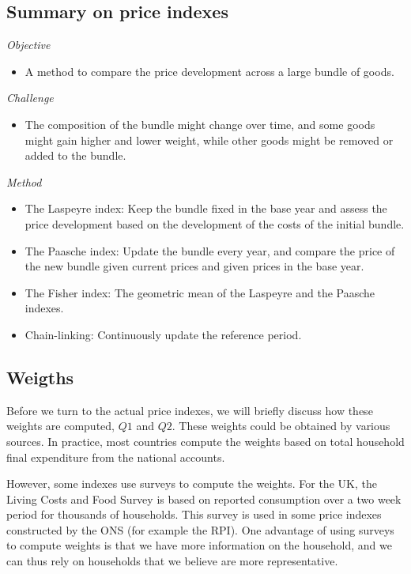 \documentclass[]{book}
\providecommand{\tightlist}{%
  \setlength{\itemsep}{0pt}\setlength{\parskip}{0pt}}
\begin{document}
\hypertarget{summary-on-price-indexes}{%
\subsection{Summary on price indexes}\label{summary-on-price-indexes}}

\emph{Objective}

\begin{itemize}
\tightlist
\item
  A method to compare the price development across a large bundle of goods.
\end{itemize}

\emph{Challenge}

\begin{itemize}
\tightlist
\item
  The composition of the bundle might change over time, and some goods might gain higher and lower weight, while other goods might be removed or added to the bundle.
\end{itemize}

\emph{Method}

\begin{itemize}
\tightlist
\item
  The Laspeyre index: Keep the bundle fixed in the base year and assess the price development based on the development of the costs of the initial bundle.
\item
  The Paasche index: Update the bundle every year, and compare the price of the new bundle given current prices and given prices in the base year.
\item
  The Fisher index: The geometric mean of the Laspeyre and the Paasche indexes.
\item
  Chain-linking: Continuously update the reference period.
\end{itemize}

\hypertarget{weigths}{%
\subsection{Weigths}\label{weigths}}

Before we turn to the actual price indexes, we will briefly discuss how these weights are computed, \(Q1\) and \(Q2\). These weights could be obtained by various sources. In practice, most countries compute the weights based on total household final expenditure from the national accounts.

However, some indexes use surveys to compute the weights. For the UK, the Living Costs and Food Survey is based on reported consumption over a two week period for thousands of households. This survey is used in some price indexes constructed by the ONS (for example the RPI). One advantage of using surveys to compute weights is that we have more information on the household, and we can thus rely on households that we believe are more representative.
\end{document}
